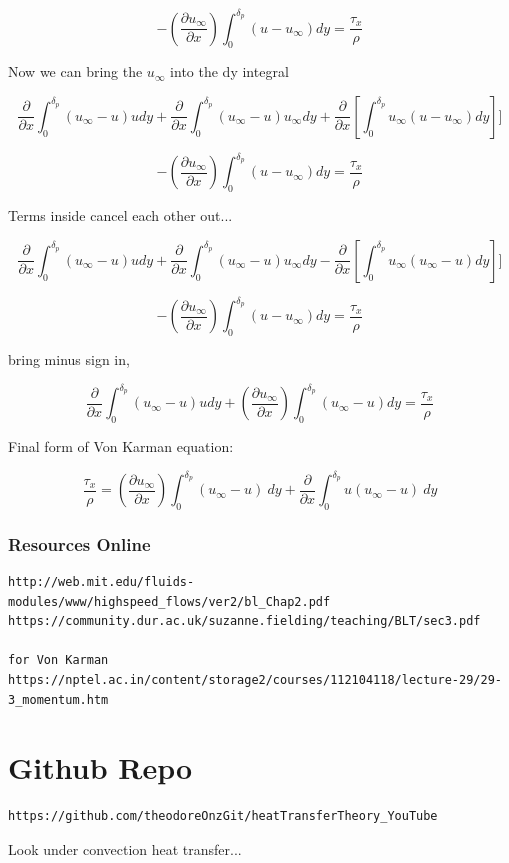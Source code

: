 \documentclass[11pt]{article}
\begin{document}
$$-( \frac{\partial u_\infty}{\partial x}) \int_0^{\delta_p} (u - u_\infty )dy = \frac{\tau_x}{\rho}  $$

Now we can bring the $u_\infty$ into the dy integral

$$  \frac{\partial}{\partial x}   \int_0^{\delta_p} ( u_\infty - u) u dy  + \frac{\partial}{\partial x}   \int_0^{\delta_p} ( u_\infty - u) u_\infty dy  +\frac{\partial }{\partial x}[\int_0^{\delta_p} u_\infty (u -  u_\infty )dy]] $$

$$-( \frac{\partial u_\infty}{\partial x}) \int_0^{\delta_p} (u - u_\infty )dy = \frac{\tau_x}{\rho}  $$


Terms inside cancel each other out...

$$  \frac{\partial}{\partial x}   \int_0^{\delta_p} ( u_\infty - u) u dy  + \frac{\partial}{\partial x}   \int_0^{\delta_p} ( u_\infty - u) u_\infty dy  -\frac{\partial }{\partial x}[\int_0^{\delta_p} u_\infty ( u_\infty - u)dy]] $$

$$-( \frac{\partial u_\infty}{\partial x}) \int_0^{\delta_p} (u - u_\infty )dy = \frac{\tau_x}{\rho}  $$

bring minus sign in,


$$  \frac{\partial}{\partial x}   \int_0^{\delta_p} ( u_\infty - u) u dy +( \frac{\partial u_\infty}{\partial x}) \int_0^{\delta_p} ( u_\infty - u )dy = \frac{\tau_x}{\rho}  $$

Final form of Von Karman equation:

$$ \frac{\tau_x}{\rho} = ( \frac{\partial u_\infty}{\partial x}) \int_0^{\delta_p} ( u_\infty - u ) \ dy  + \frac{\partial}{\partial x}   \int_0^{\delta_p} u( u_\infty - u) \ dy $$

\section{Resources Online}


\begin{verbatim}
http://web.mit.edu/fluids-modules/www/highspeed_flows/ver2/bl_Chap2.pdf
https://community.dur.ac.uk/suzanne.fielding/teaching/BLT/sec3.pdf

for Von Karman
https://nptel.ac.in/content/storage2/courses/112104118/lecture-29/29-3_momentum.htm
\end{verbatim}

\part{Github Repo}
\begin{verbatim}
https://github.com/theodoreOnzGit/heatTransferTheory_YouTube
\end{verbatim}

Look under convection heat transfer...
\end{document}
